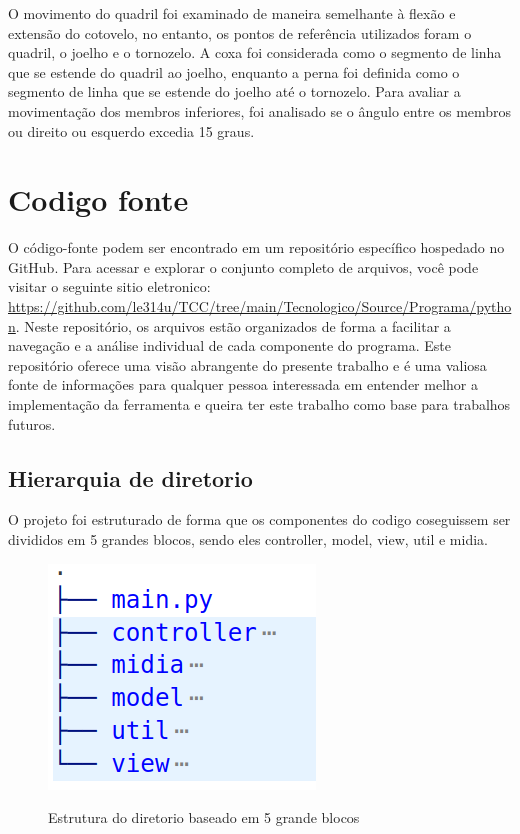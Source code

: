  O movimento do quadril foi examinado de maneira semelhante à flexão e extensão do cotovelo, no entanto, os pontos de referência utilizados foram o quadril, o joelho e o tornozelo. A coxa foi considerada como o segmento de linha que se estende do quadril ao joelho, enquanto a perna foi definida como o segmento de linha que se estende do joelho até o tornozelo. Para avaliar a movimentação dos membros inferiores, foi analisado se o ângulo entre os membros ou direito ou esquerdo excedia 15 graus.





 \section[Codigo fonte]{Codigo fonte}

 O código-fonte podem ser encontrado em um repositório específico hospedado no GitHub. Para acessar e explorar o conjunto completo de arquivos, você pode visitar o seguinte sitio eletronico: \url{https://github.com/le314u/TCC/tree/main/Tecnologico/Source/Programa/python}. Neste repositório, os arquivos estão organizados de forma a facilitar a navegação e a análise individual de cada componente do programa. Este repositório oferece uma visão abrangente do presente trabalho e é uma valiosa fonte de informações para qualquer pessoa interessada em entender melhor a implementação da ferramenta e queira ter este trabalho como base para trabalhos futuros.
 
 

\subsection[Hierarquia de diretorio]{Hierarquia de diretorio}


O projeto foi estruturado de forma que os componentes do codigo coseguissem ser divididos em  5 grandes blocos, sendo eles controller, model, view, util e midia. 

\begin{figure}[H]
	\centering
    \caption{Estrutura do diretorio baseado em 5 grande blocos }
	\includegraphics[scale=0.5]{figuras/diretorios/Blocos.png}
	\label{fig:blocos}
\end{figure}


